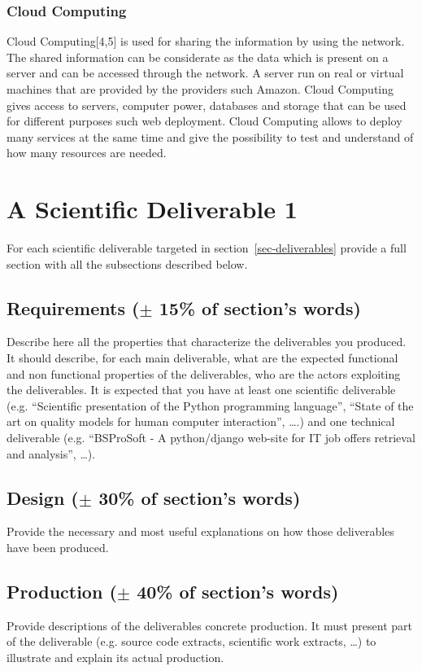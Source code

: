 \documentclass[conference,compsoc]{IEEEtran}
\begin{document}
\subsubsection{Cloud Computing}
Cloud Computing[4,5] is used for sharing the information by using the network. The shared information can be considerate as the data which is present on a server and can be accessed through the network. A server run on real or virtual machines that are provided by the providers such Amazon. Cloud Computing gives access to servers, computer power, databases and storage that can be used for different purposes such web deployment.  Cloud Computing allows to deploy many services at the same time and give the possibility to test and understand of how many resources are needed. 

\section{ A Scientific Deliverable 1}
For each scientific deliverable targeted in section~\ref{sec-deliverables} provide a full section with all the subsections described below.
\label{sec-production}
\subsection{Requirements ($\pm$ 15\% of section's words)}
Describe here all the properties that characterize the deliverables you produced. It should describe, for each main deliverable, what are the expected functional and non functional properties of the deliverables, who are the actors exploiting the deliverables. It is expected that you have at least one scientific deliverable (e.g. ``Scientific presentation of the Python programming language'', ``State of the art on quality models for human computer interaction'', \ldots.) and one technical deliverable (e.g. ``BSProSoft - A python/django web-site for IT job offers retrieval and analysis'', \ldots). 
\subsection{Design ($\pm$ 30\% of section's words)}
Provide the necessary and most useful explanations on how those deliverables have been produced.
\subsection{Production ($\pm$ 40\% of section's words)}
Provide descriptions of the deliverables concrete production. It must present part of the deliverable (e.g. source code extracts, scientific work extracts, \ldots) to illustrate and explain its actual production.
\end{document}
